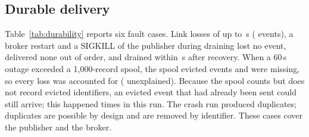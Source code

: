 \documentclass[conference]{IEEEtran}
\begin{document}
\subsection{Durable delivery}
\begin{table}[!t]
\centering
\caption{Delivery through a real Mosquitto \SpoolBrokerVersion{} broker at 30 events/s (QoS 1, synchronous spool inserts). Miss.: events never received; Evict.: removed by the spool capacity; Dup.: repeated deliveries; Order: first deliveries out of sequence; Peak: largest spool depth.}
\label{tab:durability}
\footnotesize\setlength{\tabcolsep}{3.5pt}
\resizebox{\columnwidth}{!}{}
\end{table}
Table~\ref{tab:durability} reports six fault cases. Link losses of up to \SpoolMaxOutage{}\,s (\SpoolMaxEvents{} events), a broker restart and a SIGKILL of the publisher during draining lost no event, delivered none out of order, and drained within \SpoolMaxDrain{}\,s after recovery. When a 60\,s outage exceeded a 1{,}000-record spool, the spool evicted \SpoolOverflowEvicted{} events and \SpoolOverflowMissing{} were missing, so every loss was accounted for (\SpoolUnexplainedMissing{} unexplained). Because the spool counts but does not record evicted identifiers, an evicted event that had already been sent could still arrive; this happened \SpoolOverflowEvictedDelivered{} times in this run. The crash run produced \SpoolCrashDuplicates{} duplicates; duplicates are possible by design and are removed by identifier. These cases cover the publisher and the broker.

\begin{table}[!t]
\centering
\caption{Failures beyond the publisher and broker (same broker, 30 events/s, QoS~1). Top: the audit-log subscriber is killed with SIGKILL after 5\,s and restarted after the stated time; queue: the broker's limit on queued messages per offline client (1{,}000 is the Mosquitto default). Missing: events never stored in the audit log. Bottom: the inspection process is killed at a random time 1--3\,s after start; handed off: decisions whose spool insert (synchronous) or queue submission (writer thread) had returned; lost: handed off but not in the spool afterwards (kills with a loss).}
\label{tab:failures}
\footnotesize\setlength{\tabcolsep}{3.5pt}
\resizebox{\columnwidth}{!}{}
\end{table}
\end{document}
